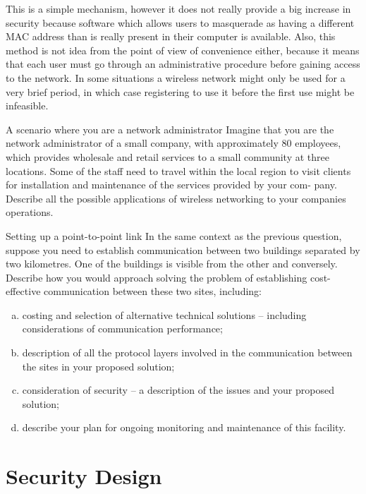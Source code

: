 This is a simple mechanism, however it does not really provide a big increase in security because software which allows users to masquerade as having a different MAC address than is really present in their computer is available. Also, this method is not idea from the point of view of convenience either, because it means that each user must go through an administrative procedure before gaining access to the network. In some situations a wireless network might only be used for a very brief period, in which case registering to use it before the first use might be infeasible.

\begin{exercise}{A scenario where you are a network administrator}
Imagine that you are the network administrator of a small company, with
approximately 80 employees, which provides wholesale and retail services to a small
community at three locations. Some of the staff need to travel within the local region
to visit clients for installation and maintenance of the services provided by your com-
pany. Describe all the possible applications of wireless networking to your companies
operations.
\end{exercise}

\begin{exercise}{Setting up a point-to-point link}
In the same context as the previous question, suppose you need to establish 
communication between two buildings separated by two kilometres. One of the
buildings is visible from the other and conversely. Describe how you would approach
solving the problem of establishing cost-effective communication between these two
sites, including:
\begin{enumerate}[(a)]
\item costing and selection of alternative technical solutions – including considerations
of communication performance;
\item description of all the protocol layers involved in the communication between the
sites in your proposed solution;
\item consideration of security – a description of the issues and your proposed solution;
\item describe your plan for ongoing monitoring and maintenance of this facility.
\end{enumerate}
\end{exercise}

\section{Security Design}

